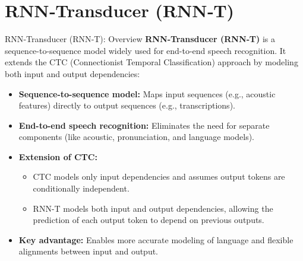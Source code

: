 \section{RNN‑Transducer (RNN‑T)}

\begin{frame}[t,allowframebreaks]{RNN‑Transducer (RNN‑T): Overview}
    \textbf{RNN‑Transducer (RNN‑T)} is a sequence-to-sequence model widely used for end-to-end speech recognition. It extends the CTC (Connectionist Temporal Classification) approach by modeling both input and output dependencies:

    \begin{itemize}
        \item \textbf{Sequence-to-sequence model:} Maps input sequences (e.g., acoustic features) directly to output sequences (e.g., transcriptions).
        \item \textbf{End-to-end speech recognition:} Eliminates the need for separate components (like acoustic, pronunciation, and language models).
        \item \textbf{Extension of CTC:} 
            \begin{itemize}
                \setlength{\itemsep}{-0.5em}
                \item CTC models only input dependencies and assumes output tokens are conditionally independent.
                \item RNN-T models both input and output dependencies, allowing the prediction of each output token to depend on previous outputs.
            \end{itemize}
        \item \textbf{Key advantage:} Enables more accurate modeling of language and flexible alignments between input and output.
    \end{itemize}


\end{frame}
